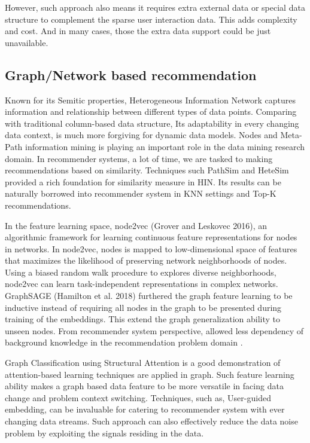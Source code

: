 However, such approach also means it requires extra external data or special data structure to complement the sparse user interaction data. This adds complexity and cost. And in many cases, those the extra data support could be just unavailable. 

\subsection{Graph/Network based recommendation}
Known for its Semitic properties, Heterogeneous Information Network captures information and relationship between different types of data points. Comparing with traditional column-based data structure, Its adaptability in every changing data context, is much more forgiving for dynamic data models. Nodes and Meta-Path information mining is playing an important role in the data mining research domain. In recommender systems, a lot of time, we are tasked to making recommendations based on similarity. Techniques such PathSim \citep{Sun2011PathSim} and HeteSim \citep{Shi2013HeteSim} provided a rich foundation for similarity measure in HIN. Its results can be naturally borrowed into recommender system in KNN settings and Top-K recommendations. 

In the feature learning space, node2vec (Grover and Leskovec 2016), an algorithmic framework for learning continuous feature representations for nodes in networks. In node2vec, nodes is mapped to low-dimensional space of features that maximizes the likelihood of preserving network neighborhoods of nodes. Using a biased random walk procedure to explores diverse neighborhoods, node2vec can learn task-independent representations in complex networks. GraphSAGE (Hamilton et al. 2018) furthered the graph feature learning to be inductive instead of requiring all nodes in the graph to be presented during training of the embeddings. This extend the graph generalization ability to unseen nodes. From recommender system perspective, allowed less dependency of background knowledge in the recommendation problem domain \citep{Hu2018}.  

Graph Classification using Structural Attention \citep{lee2018graph} is a good demonstration of attention-based learning techniques are applied in graph. Such feature learning ability makes a graph based data feature to be more versatile in facing data change and problem context switching. 
Techniques, such as, User-guided embedding, can be invaluable for catering to recommender system with ever changing data streams. Such approach can also effectively reduce the data noise problem by exploiting the signals residing in the data.  

